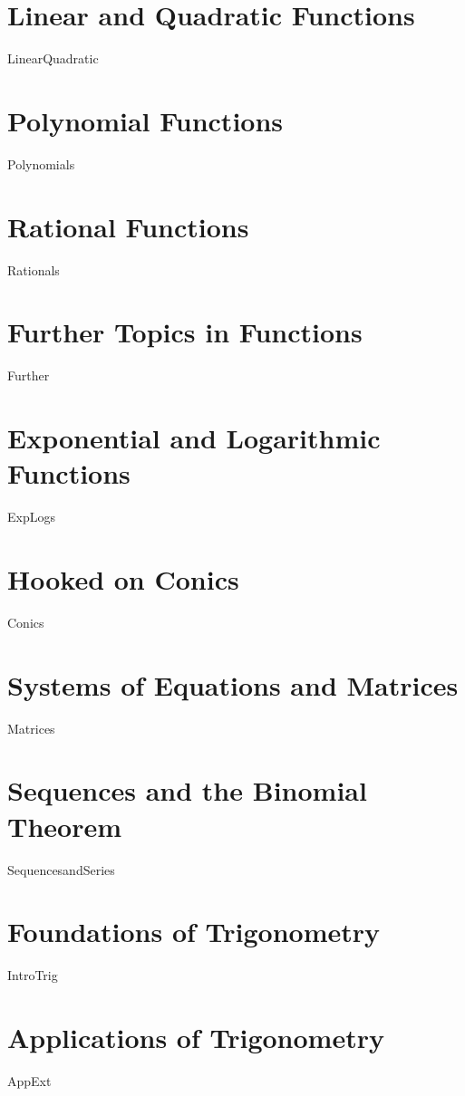 \documentclass[11pt]{book}
\theoremstyle{definition}  %
\begin{document}
\chapter{Linear and Quadratic Functions}
\label{LinearQuadratic}
\thispagestyle{empty}
{LinearQuadratic}

\chapter{Polynomial Functions}
\label{Polynomials}
\thispagestyle{empty}
{Polynomials}

\chapter{Rational Functions}
\label{Rationals}
\thispagestyle{empty}
{Rationals}

\chapter{Further Topics in Functions}
\label{Further}
\thispagestyle{empty}
{Further}

\chapter{Exponential and Logarithmic Functions}
\label{ExpLogs}
\thispagestyle{empty}
{ExpLogs}

\chapter{Hooked on Conics}
\label{Conics}
\thispagestyle{empty}
{Conics}

\chapter{Systems of Equations and Matrices}
\label{Matrices}
\thispagestyle{empty}
{Matrices}

\chapter{Sequences and the Binomial Theorem}
\label{SequencesandSeries}
\thispagestyle{empty}
{SequencesandSeries}

\chapter{Foundations of Trigonometry}
\label{IntroTrig}
\thispagestyle{empty}
{IntroTrig}

\chapter{Applications of Trigonometry}
\label{AppExt}
\thispagestyle{empty}
{AppExt}

\printindex
\end{document}
